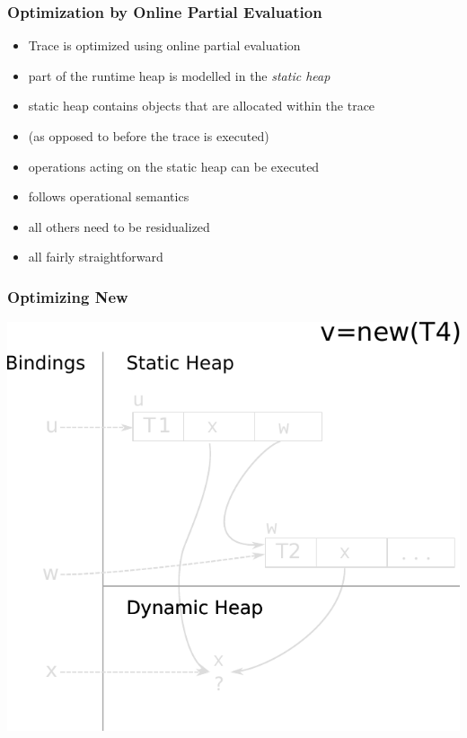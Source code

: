 \documentclass[utf8x]{beamer}
\begin{document}
\begin{frame}
  \frametitle{Optimization by Online Partial Evaluation}
  \begin{itemize}
      \item Trace is optimized using online partial evaluation
      \item part of the runtime heap is modelled in the \emph{static heap}
      \item static heap contains objects that are allocated within the trace
      \item (as opposed to before the trace is executed)
      \pause
      \item operations acting on the static heap can be executed
      \item follows operational semantics
      \item all others need to be residualized
      \item all fairly straightforward
  \end{itemize}
\end{frame}


\begin{frame}[plain]
  \frametitle{Optimizing New}
  \includegraphics[scale=0.8]{figures/opt_new1}
\end{frame}
\end{document}

